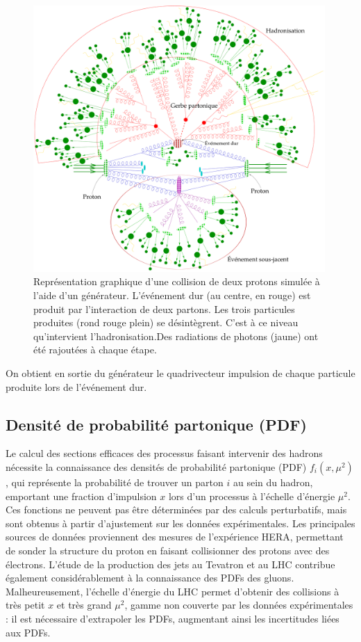 \begin{figure}[tbp]
    \centering
    \includegraphics[width=0.99\textwidth]{chapitre3/figs/parton_shower_legend.pdf}
    \caption{Représentation graphique d'une collision de deux protons simulée à l'aide d'un générateur. L'événement dur (au centre, en rouge) est produit par l'interaction de deux partons. Les trois particules produites (rond rouge plein) se désintègrent. C'est à ce niveau qu'intervient l'hadronisation.Des radiations de photons (jaune) ont été rajoutées à chaque étape.}
    \label{fig:parton_shower}
\end{figure}

On obtient en sortie du générateur le quadrivecteur impulsion de chaque particule produite lors de l'événement dur.

\subsection{Densité de probabilité partonique (PDF)} \label{sec:pdf}

Le calcul des sections efficaces des processus faisant intervenir des hadrons nécessite la connaissance des densités de probabilité partonique (PDF) $f_i\left( x, \mu^2 \right)$, qui représente la probabilité de trouver un parton $i$ au sein du hadron, emportant une fraction d'impulsion $x$ lors d'un processus à l'échelle d'énergie $\mu^2$. Ces fonctions ne peuvent pas être déterminées par des calculs perturbatifs, mais sont obtenus à partir d'ajustement sur les données expérimentales. Les principales sources de données proviennent des mesures de l'expérience HERA, permettant de sonder la structure du proton en faisant collisionner des protons avec des électrons. L'étude de la production des jets au Tevatron et au LHC contribue également considérablement à la connaissance des PDFs des gluons. Malheureusement, l'échelle d'énergie du LHC permet d'obtenir des collisions à très petit $x$ et très grand $\mu^2$, gamme non couverte par les données expérimentales : il est nécessaire d'extrapoler les PDFs, augmentant ainsi les incertitudes liées aux PDFs.

